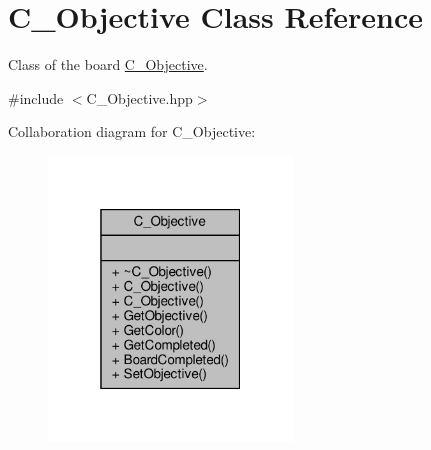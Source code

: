 \hypertarget{classC__Objective}{}\section{C\+\_\+\+Objective Class Reference}
\label{classC__Objective}


Class of the board \hyperlink{classC__Objective}{C\+\_\+\+Objective}.  




{\ttfamily \#include $<$C\+\_\+\+Objective.\+hpp$>$}



Collaboration diagram for C\+\_\+\+Objective\+:
\nopagebreak
\begin{figure}[H]
\begin{center}
\leavevmode
\includegraphics[width=184pt]{classC__Objective__coll__graph}
\end{center}
\end{figure}
